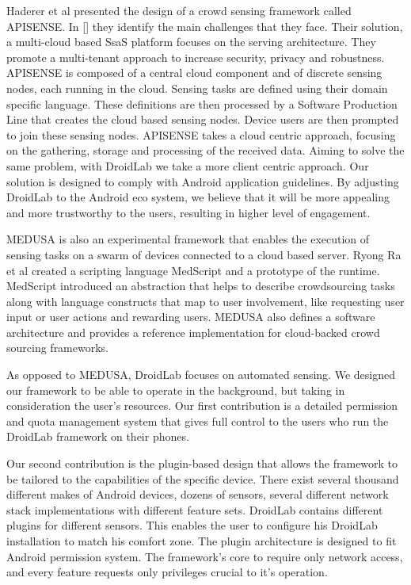 \documentclass[conference,letterpaper]{IEEEtran}
\begin{document}
Haderer et al presented the design of a crowd sensing framework called APISENSE. 
In [] they identify the main challenges that they face. Their solution, a multi-cloud based SsaS platform focuses on the serving architecture. 
They promote a multi-tenant approach to increase security, privacy and robustness. APISENSE is composed of a central cloud component and of discrete sensing nodes, each running in the cloud. Sensing tasks are defined using their domain specific language. These definitions are then processed by a Software Production Line that creates the cloud based sensing nodes. Device users are then prompted to join these sensing nodes. APISENSE takes a cloud centric approach, focusing on the gathering, storage and processing of the received data. Aiming to solve the same problem, with DroidLab we take a more client centric approach. 
Our solution is designed to comply with Android application guidelines. By adjusting DroidLab to the Android eco system, we believe that it will be more appealing and more trustworthy to the users, resulting in higher level of engagement.

MEDUSA is also an experimental framework that enables the execution of sensing tasks on a swarm of devices connected to a cloud based server. Ryong Ra et al created a scripting language MedScript and a prototype of the runtime. MedScript introduced an abstraction that helps to describe crowdsourcing tasks along with language constructs that map to user involvement, like requesting user input or user actions and rewarding users. MEDUSA also defines a software architecture and provides a reference implementation for cloud-backed crowd sourcing frameworks.

As opposed to MEDUSA, DroidLab focuses on automated sensing. We designed our framework to be able to operate in the background, but taking in consideration the user's resources. Our first contribution is a detailed permission and quota management system that gives full control to the users who run the DroidLab framework on their phones.

Our second contribution is the plugin-based design that allows the framework to be tailored to the capabilities of the specific device. There exist several thousand different makes of Android devices, dozens of sensors, several different network stack implementations with different feature sets. DroidLab contains different plugins for different sensors. This enables the user to configure his DroidLab installation to match his comfort zone. The plugin architecture is designed to fit Android permission system. The framework's core to require only network access, and every feature requests only privileges crucial to it's operation.
\end{document}
